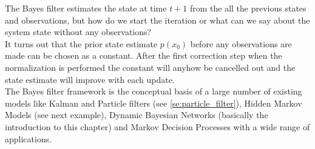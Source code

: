 \documentclass{tstextbook}
\begin{document}
The Bayes filter estimates the state at time $t+1$ from the all the previous states and observations, but how do we start the iteration or what can we say about the system state without any observations?\\

It turns out that the prior state estimate $p(x_0)$ before any observations are made can be chosen as a constant. After the first correction step when the normalization is performed the constant will anyhow be cancelled out and the state estimate will improve with each update.\\  

The Bayes filter framework is the conceptual basis of a large number of existing models like Kalman and Particle filters (see \ref{se:particle_filter}), Hidden Markov Models (see next example), Dynamic Bayesian Networks (basically the introduction to this chapter) and Markov Decision Processes with a wide range of applications.
\end{document}
